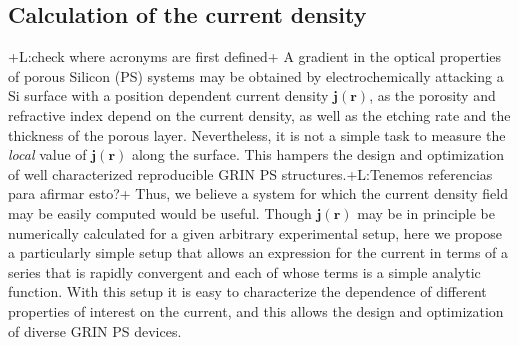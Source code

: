 \documentclass{article}
\newcommand{\notaL}[1]{{\color{blue}+L:#1+}}
\begin{document}
\subsection{Calculation of the current density}
\label{sec:calc-curr-dens}
\notaL{check where acronyms are first defined}
A gradient in the optical properties of porous Silicon (PS) systems may be
obtained by electrochemically attacking a Si surface with a position dependent current
density ${\bm j(\bm r)}$, as the porosity and refractive index depend on
the current density, as well as the etching rate and the thickness of the
porous layer. Nevertheless, it is not a simple task to measure the
{\em local} value of $\bm j(\bm r)$ along the surface. This hampers the
design and optimization of well characterized reproducible GRIN PS
structures.\notaL{Tenemos referencias para afirmar esto?} Thus, we
believe a
system for which the current density field may be
easily computed would be useful.
Though $\bm j(\bm r)$ may be in principle be numerically calculated for a
given arbitrary experimental setup,  here we propose a particularly
simple setup that allows an expression for the current in terms
of a series that is rapidly convergent and each of whose terms is a
simple analytic function. With this setup it is easy to characterize
the dependence of different properties of interest on the current, and
this allows the design and optimization of diverse GRIN PS devices.
\end{document}
